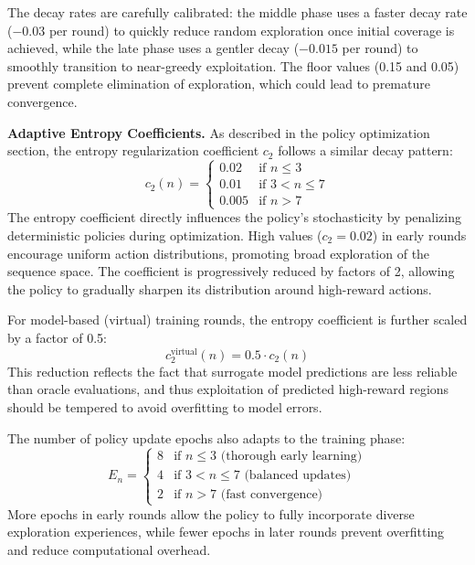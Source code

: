 \documentclass[conference]{IEEEtran}
\begin{document}
The decay rates are carefully calibrated: the middle phase uses a faster decay rate ($-0.03$ per round) to quickly reduce random exploration once initial coverage is achieved, while the late phase uses a gentler decay ($-0.015$ per round) to smoothly transition to near-greedy exploitation. The floor values (0.15 and 0.05) prevent complete elimination of exploration, which could lead to premature convergence.

\textbf{Adaptive Entropy Coefficients.} As described in the policy optimization section, the entropy regularization coefficient $c_2$ follows a similar decay pattern:
%
\begin{equation}
c_2(n) = \begin{cases}
0.02 & \text{if } n \leq 3 \\
0.01 & \text{if } 3 < n \leq 7 \\
0.005 & \text{if } n > 7
\end{cases}
\end{equation}
%
The entropy coefficient directly influences the policy's stochasticity by penalizing deterministic policies during optimization. High values ($c_2 = 0.02$) in early rounds encourage uniform action distributions, promoting broad exploration of the sequence space. The coefficient is progressively reduced by factors of 2, allowing the policy to gradually sharpen its distribution around high-reward actions.

For model-based (virtual) training rounds, the entropy coefficient is further scaled by a factor of 0.5:
%
\begin{equation}
c_2^{\text{virtual}}(n) = 0.5 \cdot c_2(n)
\end{equation}
%
This reduction reflects the fact that surrogate model predictions are less reliable than oracle evaluations, and thus exploitation of predicted high-reward regions should be tempered to avoid overfitting to model errors.

The number of policy update epochs also adapts to the training phase:
%
\begin{equation}
E_n = \begin{cases}
8 & \text{if } n \leq 3 \text{ (thorough early learning)} \\
4 & \text{if } 3 < n \leq 7 \text{ (balanced updates)} \\
2 & \text{if } n > 7 \text{ (fast convergence)}
\end{cases}
\end{equation}
%
More epochs in early rounds allow the policy to fully incorporate diverse exploration experiences, while fewer epochs in later rounds prevent overfitting and reduce computational overhead.
\end{document}

